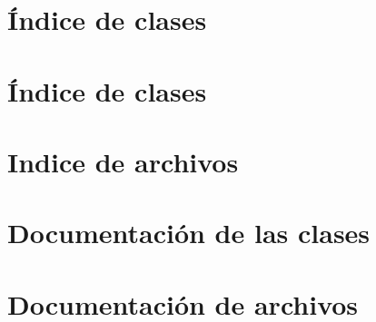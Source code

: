 \documentclass[a4paper]{article}
\begin{document}
\section{Índice de clases}

\section{Índice de clases}

\section{\-Indice de archivos}

\section{\-Documentación de las clases}






\section{\-Documentación de archivos}


\newpage 

\printindex
\end{document}
